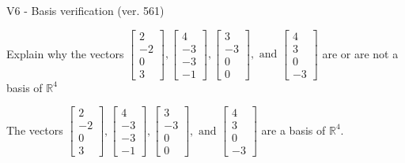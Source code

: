 \begin{exercise}
  \begin{exerciseTitle}V6 - Basis verification (ver. 561)\end{exerciseTitle}
  \begin{exerciseStatement}
    Explain why the vectors \(\left[\begin{array}{r}
2 \\
-2 \\
0 \\
3
\end{array}\right] , \left[\begin{array}{r}
4 \\
-3 \\
-3 \\
-1
\end{array}\right] , \left[\begin{array}{r}
3 \\
-3 \\
0 \\
0
\end{array}\right] , \text{ and } \left[\begin{array}{r}
4 \\
3 \\
0 \\
-3
\end{array}\right]\) are or are not a basis of \(\mathbb{R}^4\)	


  \end{exerciseStatement}
  \begin{exerciseAnswer}
   The vectors \(\left[\begin{array}{r}
2 \\
-2 \\
0 \\
3
\end{array}\right] , \left[\begin{array}{r}
4 \\
-3 \\
-3 \\
-1
\end{array}\right] , \left[\begin{array}{r}
3 \\
-3 \\
0 \\
0
\end{array}\right] , \text{ and } \left[\begin{array}{r}
4 \\
3 \\
0 \\
-3
\end{array}\right]\) 
  	 are  a basis of \(\mathbb{R}^4\).
  


  \end{exerciseAnswer}
\end{exercise}